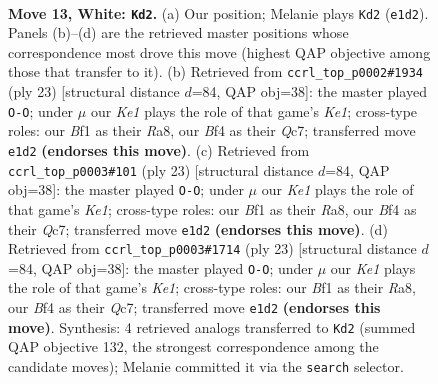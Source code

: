 \documentclass[11pt]{article}
\begin{document}
\clearpage

\begin{figure}[p]\centering
\begin{subfigure}{0.46\textwidth}\centering
\resizebox{\linewidth}{!}{%
\newchessgame
\chessboard[
  setfen={rnbqr1k1/pp3ppp/2p5/3p4/P2P1Bnb/1PN1PP2/2Q1N1PP/R3KB1R w KQ - 1 13},
  showmover=false,
  pgfstyle=straightmove, color=movearrow, markmove={e1-d2}
]}
\caption{}
\end{subfigure}\hfill
\begin{subfigure}{0.46\textwidth}\centering
\resizebox{\linewidth}{!}{%
\newchessgame
\chessboard[
  setfen={r1b1k2r/2qnbppp/p2ppn2/1p4B1/4PP2/PNN5/1PP3PP/2KRQB1R b kq - 1 12},
  showmover=false,
  pgfstyle=straightmove, color=movearrow, markmove={e8-g8}
]}
\caption{}
\end{subfigure}
\\[4pt]
\begin{subfigure}{0.46\textwidth}\centering
\resizebox{\linewidth}{!}{%
\newchessgame
\chessboard[
  setfen={r1b1k2r/2qnbppp/p2ppn2/1p4B1/4PP2/PNN5/1PP3PP/2KRQB1R b kq - 3 12},
  showmover=false,
  pgfstyle=straightmove, color=movearrow, markmove={e8-g8}
]}
\caption{}
\end{subfigure}\hfill
\begin{subfigure}{0.46\textwidth}\centering
\resizebox{\linewidth}{!}{%
\newchessgame
\chessboard[
  setfen={r1b1k2r/2qnbppp/p2ppn2/1p4B1/4PP2/PNN5/1PP3PP/2KRQB1R b kq - 2 12},
  showmover=false,
  pgfstyle=straightmove, color=movearrow, markmove={e8-g8}
]}
\caption{}
\end{subfigure}
\caption{\textbf{Move 13, White: \texttt{Kd2}.} (a) Our position; Melanie plays \texttt{Kd2} (\texttt{e1d2}). Panels (b)--(d) are the retrieved master positions whose correspondence most drove this move (highest QAP objective among those that transfer to it). (b) Retrieved from \texttt{ccrl\_top\_p0002\#1934} (ply 23) [structural distance $d$=84, QAP obj=38]: the master played \texttt{O-O}; under $\mu$ our \emph{Ke1} plays the role of that game's \emph{Ke1}; cross-type roles: our \emph{B}f1 as their \emph{R}a8, our \emph{B}f4 as their \emph{Q}c7; transferred move \texttt{e1d2} \textbf{(endorses this move)}. (c) Retrieved from \texttt{ccrl\_top\_p0003\#101} (ply 23) [structural distance $d$=84, QAP obj=38]: the master played \texttt{O-O}; under $\mu$ our \emph{Ke1} plays the role of that game's \emph{Ke1}; cross-type roles: our \emph{B}f1 as their \emph{R}a8, our \emph{B}f4 as their \emph{Q}c7; transferred move \texttt{e1d2} \textbf{(endorses this move)}. (d) Retrieved from \texttt{ccrl\_top\_p0003\#1714} (ply 23) [structural distance $d$=84, QAP obj=38]: the master played \texttt{O-O}; under $\mu$ our \emph{Ke1} plays the role of that game's \emph{Ke1}; cross-type roles: our \emph{B}f1 as their \emph{R}a8, our \emph{B}f4 as their \emph{Q}c7; transferred move \texttt{e1d2} \textbf{(endorses this move)}. Synthesis: 4 retrieved analogs transferred to \texttt{Kd2} (summed QAP objective 132, the strongest correspondence among the candidate moves); Melanie committed it via the \texttt{search} selector.}
\label{fig:thought-m24}
\end{figure}
\end{document}
